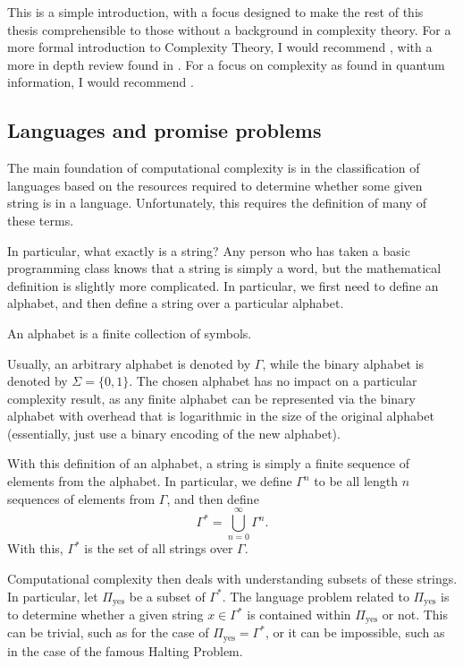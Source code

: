 \documentclass[../thesis-main/thesis-main]{subfiles}
\begin{document}
This is a simple introduction, with a focus designed to make the rest of this thesis comprehensible to those without a background in complexity theory.  For a more formal introduction to Complexity Theory, I would recommend \cite{SipserToC}, with a more in depth review found in \cite{ABCC}.  For a focus on complexity as found in quantum information, I would recommend \cite{Wat09}.

\subsection{Languages and promise problems}

The main foundation of computational complexity is in the classification of languages based on the resources required to determine whether some given string is in a language.  Unfortunately, this requires the definition of many of these terms.  

In particular, what exactly is a string?  Any person who has taken a basic programming class knows that a string is simply a word, but the mathematical definition is slightly more complicated.  In particular, we first need to define an alphabet, and then define a string over a particular alphabet.  
\begin{definition}[Alphabet] An alphabet is a finite collection of symbols.
\end{definition}
Usually, an arbitrary alphabet is denoted by $\Gamma$, while the binary alphabet is denoted by $\Sigma = \{0,1\}$.  The chosen alphabet has no impact on a particular complexity result, as any finite alphabet can be represented via the binary alphabet with overhead that is logarithmic in the size of the original alphabet (essentially, just use a binary encoding of the new alphabet).  

With this definition of an alphabet, a string is simply a finite sequence of elements from the alphabet.  In particular, we define $\Gamma^n$ to be all length $n$ sequences of elements from $\Gamma$, and then define
\begin{equation}
  \Gamma^* = \bigcup_{n=0}^\infty \Gamma^n.
\end{equation}
With this, $\Gamma^*$ is the set of all strings over $\Gamma$.

Computational complexity then deals with understanding subsets of these strings.  In particular, let $\Pi_{\text{yes}}$ be a subset of $\Gamma^*$.  The language problem related to $\Pi_{\text{yes}}$ is to determine whether a given string $x\in \Gamma^*$ is contained within $\Pi_{\text{yes}}$ or not.  This can be trivial, such as for the case of $\Pi_{\text{yes}} = \Gamma^*$, or it can be impossible, such as in the case of the famous Halting Problem. 
\end{document}
